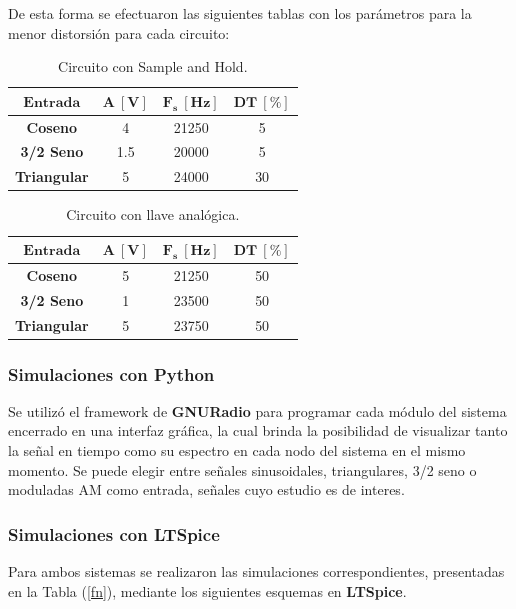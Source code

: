 De esta forma se efectuaron las siguientes tablas con los parámetros para la menor distorsión para cada circuito:
\begin{multicols}{2}
\begin{table}[H]
\centering
\begin{tabular}{cccc}
\hline
$\mathbf{Entrada}$  & $\mathbf{A \ [V]}$ & $\mathbf{F_s \ [Hz]}$ & $\mathbf{DT \ [\%]}$ \\ \hline
\textbf{Coseno}     & 4                  & 21250                 & 5                    \\
\textbf{3/2 Seno}   & 1.5                & 20000                 & 5                    \\
\textbf{Triangular} & 5                  & 24000                 & 30                  	\\ \hline
\end{tabular}
\caption{Circuito con Sample and Hold.}
\end{table}
\begin{table}[H]
\centering
\begin{tabular}{cccc}
\hline
$\mathbf{Entrada}$  & $\mathbf{A \ [V]}$ & $\mathbf{F_s \ [Hz]}$ & $\mathbf{DT \ [\%]}$ \\ \hline
\textbf{Coseno}     & 5                  & 21250                 & 50                   \\
\textbf{3/2 Seno}   & 1                  & 23500                 & 50                   \\
\textbf{Triangular} & 5                  & 23750                 & 50                   \\ \hline
\end{tabular}
\caption{Circuito con llave analógica.}
\end{table}
\end{multicols}

\subsubsection{Simulaciones con Python}
Se utilizó el framework de \textbf{GNURadio} para programar cada módulo del sistema encerrado en una interfaz gráfica, la cual brinda la posibilidad de visualizar tanto la señal en tiempo como su espectro en cada nodo del sistema en el mismo momento. Se puede elegir entre señales sinusoidales, triangulares, 3/2 seno o moduladas AM como entrada, señales cuyo estudio es de interes.

\subsubsection{Simulaciones con LTSpice}
Para ambos sistemas se realizaron las simulaciones correspondientes, presentadas en la Tabla (\ref{fn}), mediante los siguientes esquemas en \textbf{LTSpice}.

